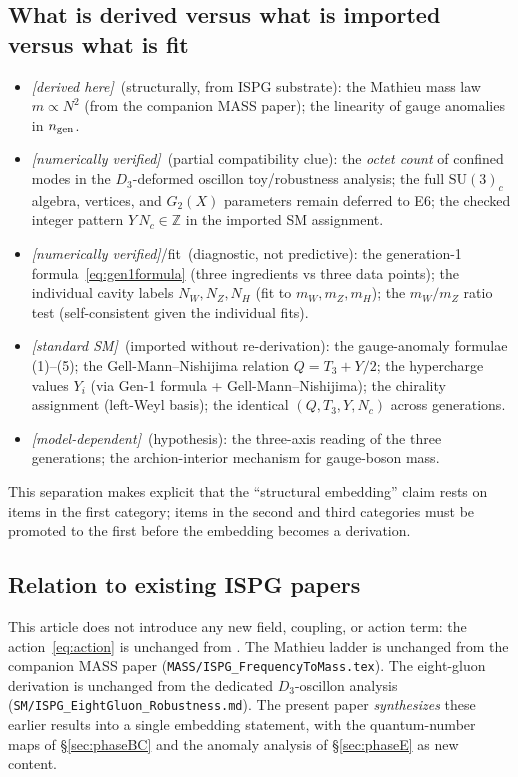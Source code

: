 \documentclass[11pt]{article}
\newcommand{\derived}{\textit{[derived here]}}
\newcommand{\fromSM}{\textit{[standard SM]}}
\newcommand{\numerical}{\textit{[numerically verified]}}
\newcommand{\modeldep}{\textit{[model-dependent]}}
\begin{document}
\subsection{What is derived versus what is imported versus what
is fit}

\begin{itemize}
  \item \derived\ (structurally, from ISPG substrate):
    the Mathieu mass law $m\propto N^2$ (from the companion
    MASS paper);
    the linearity of gauge anomalies in $n_{\rm gen}$.
  \item \numerical\ (partial compatibility clue):
    the \emph{octet count} of confined modes in the
    $D_3$-deformed oscillon toy/robustness analysis; the
    full $\mathrm{SU}(3)_c$ algebra, vertices, and
    $G_2(X)$ parameters remain deferred to E6; the checked
    integer pattern $Y\,N_c\in\mathbb{Z}$ in the imported SM
    assignment.
  \item \numerical/fit\ (diagnostic, not predictive):
    the generation-1 formula~\eqref{eq:gen1formula} (three
    ingredients vs three data points); the individual
    cavity labels $N_W,N_Z,N_H$ (fit to $m_W,m_Z,m_H$); the
    $m_W/m_Z$ ratio test (self-consistent given the
    individual fits).
  \item \fromSM\ (imported without re-derivation):
    the gauge-anomaly formulae (1)--(5); the
    Gell-Mann--Nishijima relation $Q=T_3+Y/2$; the
    hypercharge values $Y_i$ (via Gen-1 formula +
    Gell-Mann--Nishijima); the chirality assignment
    (left-Weyl basis); the identical $(Q,T_3,Y,N_c)$
    across generations.
  \item \modeldep\ (hypothesis):
    the three-axis reading of the three generations;
    the archion-interior mechanism for gauge-boson mass.
\end{itemize}
This separation makes explicit that the ``structural
embedding'' claim rests on items in the first category;
items in the second and third categories must be promoted
to the first before the embedding becomes a derivation.

\subsection{Relation to existing ISPG papers}

This article does not introduce any new field, coupling, or
action term: the action~\eqref{eq:action} is unchanged from
\cite{Lotishvili2026,Lotishvili2026Q}. The Mathieu ladder is
unchanged from the companion MASS paper
(\texttt{MASS/ISPG\_FrequencyToMass.tex}). The
eight-gluon derivation is unchanged from the dedicated
$D_3$-oscillon analysis
(\texttt{SM/ISPG\_EightGluon\_Robustness.md}). The present
paper \emph{synthesizes} these earlier results into a single
embedding statement, with the quantum-number maps of
\S\ref{sec:phaseBC} and the anomaly analysis of
\S\ref{sec:phaseE} as new content.
\end{document}
